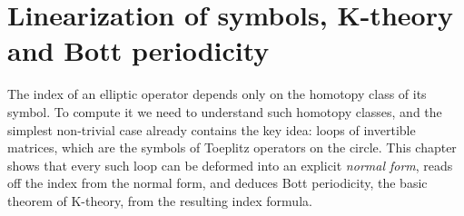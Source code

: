 \chapter{Linearization of symbols, K-theory and Bott periodicity}\label{ch:bott}
\providecommand{\Ginf}{G^{-\infty}}
\providecommand{\GinfT}{G^{-\infty}_{\mathcal{T}}}
\providecommand{\GT}{G^{0}_{\mathcal{T}}}
\providecommand{\PsiT}[1]{\Psi^{#1}_{\mathcal{T}}}
\providecommand{\Cp}{\mathcal{C}^\infty_+}
\providecommand{\Kc}{K_{\mathrm{c}}}
\providecommand{\wind}{\operatorname{wind}}
\providecommand{\Iso}{\operatorname{Iso}}
\providecommand{\rank}{\operatorname{rank}}
\providecommand{\Gres}{G^{-\infty}_{\mathrm{iso}}}
\providecommand{\Psiisoph}[1]{\Psi^{#1}_{\mathrm{iso,ph}}}
\providecommand{\OpW}{\operatorname{Op}^{\mathrm{W}}}
\providecommand{\indiso}{\operatorname{ind}_{\mathrm{iso}}}
\providecommand{\Indsl}[1]{\operatorname{Ind}^{#1}_{\mathrm{sl}}}
\providecommand{\ann}{\mathfrak{a}}

The index of an elliptic operator depends only on the homotopy class of its
symbol. To compute it we need to understand such homotopy classes, and the
simplest non-trivial case already contains the key idea: loops of invertible
matrices, which are the symbols of Toeplitz operators on the circle. This chapter
shows that every such loop can be deformed into an explicit \emph{normal form},
reads off the index from the normal form, and deduces Bott periodicity, the
basic theorem of K-theory, from the resulting index formula.

